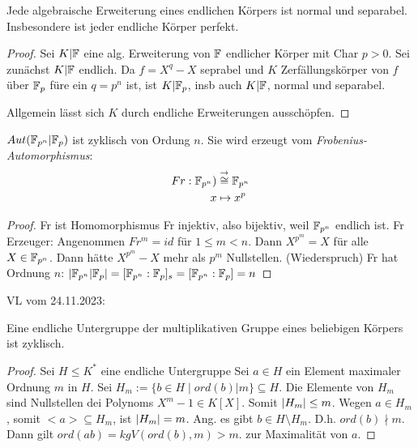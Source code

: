 \documentclass[../main.tex]{subfiles}
\begin{document}
\begin{corollary}
    Jede algebraische Erweiterung eines endlichen Körpers ist normal und separabel. Insbesondere ist jeder endliche Körper perfekt.
\end{corollary}
\begin{proof}
    Sei $K|\mathbb{F}$ eine alg. Erweiterung von $\mathbb{F}$ endlicher Körper mit Char $p>0$. Sei zunächst $K|\mathbb{F}$ endlich.
     Da $f=X^q-X$ seprabel und $K$ Zerfällungskörper von $f$ über $\mathbb{F}_p$ füre ein $q=p^n$ ist, ist $K|\mathbb{F}_p$, insb auch $K|\mathbb{F}$, normal und separabel.

     Allgemein lässt sich $K$ durch endliche Erweiterungen ausschöpfen.
\end{proof}
\begin{theorem}
    $Aut(\mathbb{F}_{p^n}| \mathbb{F}_p)$ ist zyklisch von Ordung $n$. Sie wird erzeugt vom \emph{Frobenius-Automorphismus}:
    \begin{align*}
        Fr: \mathbb{F}_{p^n} )&\overset{\rightarrow}{\cong}\mathbb{F}_{p^n}\\
        x&\mapsto x^p
    \end{align*}
\end{theorem}
\begin{proof}
    Fr ist Homomorphismus
    Fr injektiv, also bijektiv, weil $\mathbb{F}_{p^n}$ endlich ist.
    Fr Erzeuger: Angenommen $Fr^m = id$ für $1\leq m<n$. Dann $X^{p^m} = X$ für alle $X\in \mathbb{F}_{p^n}$. Dann hätte $X^{p^m}-X$ mehr als $p^m$ Nullstellen. (Wiederspruch)
    Fr hat Ordnung $n$: $\left\vert \mathbb{F}_{p^n} | \mathbb{F}_p \right\vert = [\mathbb{F}_{p^n} :\mathbb{F}_p]_s = [\mathbb{F}_{p^n}:\mathbb{F}_p] = n$
\end{proof}
\begin{flushright}
VL vom 24.11.2023:
\end{flushright}
\begin{theorem}
    Eine endliche Untergruppe der multiplikativen Gruppe eines beliebigen Körpers ist zyklisch.
\end{theorem}
\begin{proof}
    Sei $H\leq K^*$ eine endliche Untergruppe
    Sei $a\in H$ ein Element maximaler Ordnung $m$ in $H$.
    Sei $H_m := \{b\in H\mid ord(b)|m\} \subseteq H$.
    Die Elemente von $H_m$ sind Nullstellen dei Polynoms $X^m-1\in K[X]$.
    Somit $\left\vert H_m \right\vert\leq m$. Wegen $a\in H_m$, somit $<a>\subseteq H_m$, ist $\left\vert H_m \right\vert=m$.
    Ang. es gibt $b\in H\setminus H_m$. D.h. $ord(b)\nmid m$.
    Dann gilt $ord(ab)= kgV(ord(b),m) >m$.
    \Lightning zur Maximalität von $a$.
\end{proof}
\end{document}
